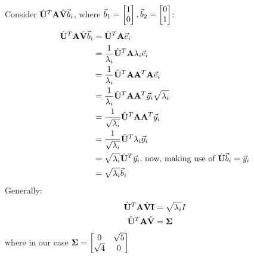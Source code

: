 Consider $\hat{\mathbf{U}}^T \mathbf{A} \hat{\mathbf{V}} \vec{b}_i$, where $\vec{b}_1 =  \begin{bmatrix} 1 \\ 0 \\ \end{bmatrix} , \vec{b}_2 =  \begin{bmatrix} 0 \\ 1 \\ \end{bmatrix} $:
\begin{equation}
    \begin{aligned}
        \hat{\mathbf{U}}^T \mathbf{A} \hat{\mathbf{V}} \vec{b}_i  &= \hat{\mathbf{U}}^T \mathbf{A} \vec{e}_i \\
                                                            &= \frac{1}{\lambda_i} \hat{\mathbf{U}}^T \mathbf{A} \lambda_i \vec{e}_i \\
                                                            &= \frac{1}{\lambda_i} \hat{\mathbf{U}}^T \mathbf{A} \mathbf{A}^T \mathbf{A} \vec{e}_i \\
                                                            &= \frac{1}{\lambda_i} \hat{\mathbf{U}}^T \mathbf{A} \mathbf{A}^T \vec{y}_i \sqrt{\lambda_i} \\
                                                            &= \frac{1}{\sqrt{\lambda_i}} \hat{\mathbf{U}}^T \mathbf{A} \mathbf{A}^T \vec{y}_i \\
                                                            &= \frac{1}{\sqrt{\lambda_i}} \hat{\mathbf{U}}^T \lambda_i \vec{y}_i \\
                                                            &= \sqrt{\lambda_i} \hat{\mathbf{U}}^T \vec{y}_i \text{, now, making use of } \hat{\mathbf{U}} \vec{b}_i = \vec{y}_i \\
                                                            &= \sqrt{\lambda_i} \vec{b}_i
    \end{aligned}
\end{equation}
Generally:
\begin{equation}
    \begin{aligned}
        \hat{\mathbf{U}}^T \mathbf{A} \hat{\mathbf{V}} \mathbf{I} &= \sqrt{\lambda_i} I \\
        \hat{\mathbf{U}}^T \mathbf{A} \hat{\mathbf{V}}   &= \mathbf{\Sigma}
    \end{aligned}
\end{equation}
where in our case $\mathbf{\Sigma} = \begin{bmatrix}
    0 & \sqrt{5} \\
    \sqrt{4} & 0 
\end{bmatrix}$

